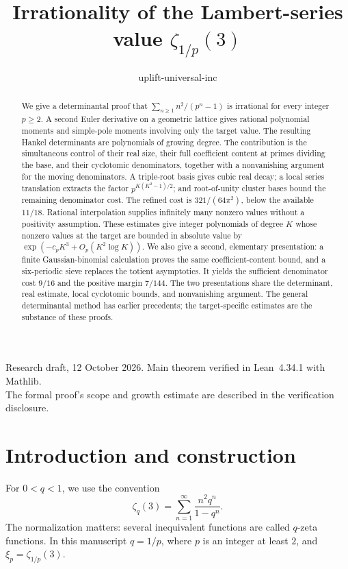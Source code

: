 \documentclass[11pt,letterpaper]{article}
\title{Irrationality of the Lambert-series value $\zeta_{1/p}(3)$}
\author{uplift-universal-inc}
\date{}
\numberwithin{equation}{section}
\theoremstyle{remark}
\begin{document}
\maketitle
\begin{abstract}
We give a determinantal proof that $\sum_{n\ge1}n^2/(p^n-1)$ is irrational for every integer $p\ge2$. A second Euler derivative on a geometric lattice gives rational polynomial moments and simple-pole moments involving only the target value. The resulting Hankel determinants are polynomials of growing degree. The contribution is the simultaneous control of their real size, their full coefficient content at primes dividing the base, and their cyclotomic denominators, together with a nonvanishing argument for the moving denominators. A triple-root basis gives cubic real decay; a local series translation extracts the factor $p^{K(K^2-1)/2}$; and root-of-unity cluster bases bound the remaining denominator cost. The refined cost is $321/(64\pi^2)$, below the available $11/18$. Rational interpolation supplies infinitely many nonzero values without a positivity assumption. These estimates give integer polynomials of degree $K$ whose nonzero values at the target are bounded in absolute value by $\exp(-c_pK^3+O_p(K^2\log K))$. We also give a second, elementary presentation: a finite Gaussian-binomial calculation proves the same coefficient-content bound, and a six-periodic sieve replaces the totient asymptotics. It yields the sufficient denominator cost $9/16$ and the positive margin $7/144$. The two presentations share the determinant, real estimate, local cyclotomic bounds, and nonvanishing argument. The general determinantal method has earlier precedents; the target-specific estimates are the substance of these proofs.
\end{abstract}
\begin{center}\small
Research draft, 12 October 2026. Main theorem verified in Lean~4.34.1 with Mathlib.\\ The formal proof's scope and growth estimate are described in the verification disclosure.
\end{center}
\tableofcontents
\clearpage
\section{Introduction and construction}

For $0<q<1$, we use the convention
\begin{equation}\label{eq:qzeta}
 \zeta_q(3)=\sum_{n=1}^{\infty}\frac{n^2q^n}{1-q^n}.
\end{equation}
The normalization matters: several inequivalent functions are called $q$-zeta functions. In this manuscript $q=1/p$, where $p$ is an integer at least $2$, and $\xi_p=\zeta_{1/p}(3)$.
\end{document}

